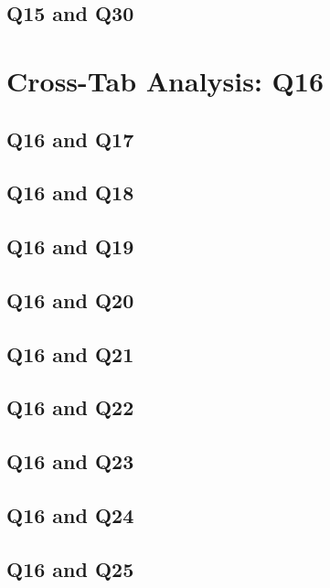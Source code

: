 \documentclass{report}
\begin{document}
\clearpage
\section{Q15 and Q30}


\chapter{Cross-Tab Analysis: Q16}
\section{Q16 and Q17}


\clearpage
\section{Q16 and Q18}


\clearpage
\section{Q16 and Q19}


\clearpage
\section{Q16 and Q20}


\clearpage
\section{Q16 and Q21}


\clearpage
\section{Q16 and Q22}


\clearpage
\section{Q16 and Q23}


\clearpage
\section{Q16 and Q24}


\clearpage
\section{Q16 and Q25}

\end{document}
